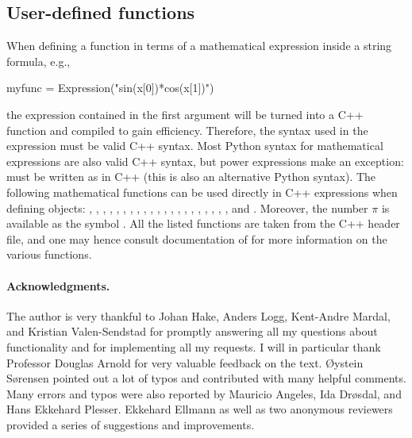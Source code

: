 \subsection{User-defined functions}
\label{langtangen:app:cpp:functions}


When defining a function in terms of a mathematical expression inside
a string formula, e.g.,
\begin{python}
myfunc = Expression("sin(x[0])*cos(x[1])")
\end{python}
the expression contained in the first argument will be turned into a
C++ function and compiled to gain efficiency. Therefore, the syntax
used in the expression must be valid C++ syntax.  Most Python syntax
for mathematical expressions are also valid C++ syntax, but power
expressions make an exception:  must be written as
 in C++ (this is also an alternative Python syntax).
The following mathematical functions can be used directly in C++
expressions when defining  objects: ,
, , , , , ,
, , , , ,
, , , , ,
, , , , and .
Moreover, the number $\pi$ is available as the symbol .  All
the listed functions are taken from the  C++ header file,
and one may hence consult documentation of  for more
information on the various functions.

\paragraph{Acknowledgments.}
The author is very thankful to Johan Hake, Anders Logg, Kent-Andre
Mardal, and Kristian Valen-Sendstad for promptly answering all my
questions about \fenics{} functionality and for implementing all my
requests. I will in particular thank Professor Douglas Arnold for very
valuable feedback on the text. \O ystein S{\o}rensen pointed out a lot
of typos and contributed with many helpful comments.  Many errors and
typos were also reported by Mauricio Angeles, Ida Dr{\o}sdal, and Hans
Ekkehard Plesser. Ekkehard Ellmann as well as two anonymous reviewers
provided a series of suggestions and improvements.
